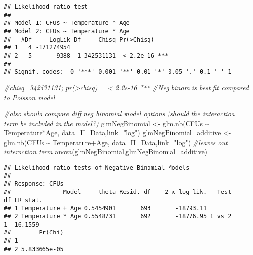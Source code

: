 \documentclass[
]{article}
\newenvironment{Shaded}{\begin{snugshade}}{\end{snugshade}}
\newcommand{\AttributeTok}[1]{\textcolor[rgb]{0.77,0.63,0.00}{#1}}
\newcommand{\CommentTok}[1]{\textcolor[rgb]{0.56,0.35,0.01}{\textit{#1}}}
\newcommand{\FunctionTok}[1]{\textcolor[rgb]{0.00,0.00,0.00}{#1}}
\newcommand{\NormalTok}[1]{#1}
\newcommand{\OtherTok}[1]{\textcolor[rgb]{0.56,0.35,0.01}{#1}}
\newcommand{\SpecialCharTok}[1]{\textcolor[rgb]{0.00,0.00,0.00}{#1}}
\newcommand{\StringTok}[1]{\textcolor[rgb]{0.31,0.60,0.02}{#1}}
\begin{document}
\begin{verbatim}
## Likelihood ratio test
## 
## Model 1: CFUs ~ Temperature * Age
## Model 2: CFUs ~ Temperature * Age
##   #Df     LogLik Df     Chisq Pr(>Chisq)    
## 1   4 -171274954                            
## 2   5      -9388  1 342531131  < 2.2e-16 ***
## ---
## Signif. codes:  0 '***' 0.001 '**' 0.01 '*' 0.05 '.' 0.1 ' ' 1
\end{verbatim}

\begin{Shaded}
\begin{Highlighting}[]
\CommentTok{\#chisq=342531131;  pr(\textgreater{}chisq) = \textless{} 2.2e{-}16 ***}
\CommentTok{\#Neg binom is best fit compared to Poisson model}

\CommentTok{\#also should compare diff neg binomial model options (should the interaction term be included in the model?)}
\NormalTok{glmNegBinomial }\OtherTok{\textless{}{-}} \FunctionTok{glm.nb}\NormalTok{(CFUs }\SpecialCharTok{\textasciitilde{}}\NormalTok{ Temperature}\SpecialCharTok{*}\NormalTok{Age, }\AttributeTok{data=}\NormalTok{II\_Data,}\AttributeTok{link=}\StringTok{"log"}\NormalTok{)}
\NormalTok{glmNegBinomial\_additive }\OtherTok{\textless{}{-}} \FunctionTok{glm.nb}\NormalTok{(CFUs }\SpecialCharTok{\textasciitilde{}}\NormalTok{ Temperature}\SpecialCharTok{+}\NormalTok{Age, }\AttributeTok{data=}\NormalTok{II\_Data,}\AttributeTok{link=}\StringTok{"log"}\NormalTok{) }\CommentTok{\#leaves out interaction term}
\FunctionTok{anova}\NormalTok{(glmNegBinomial,glmNegBinomial\_additive)}
\end{Highlighting}
\end{Shaded}

\begin{verbatim}
## Likelihood ratio tests of Negative Binomial Models
## 
## Response: CFUs
##               Model     theta Resid. df    2 x log-lik.   Test    df LR stat.
## 1 Temperature + Age 0.5454901       693       -18793.11                      
## 2 Temperature * Age 0.5548731       692       -18776.95 1 vs 2     1  16.1559
##        Pr(Chi)
## 1             
## 2 5.833665e-05
\end{verbatim}

\begin{Shaded}
\end{Shaded}
\end{document}
